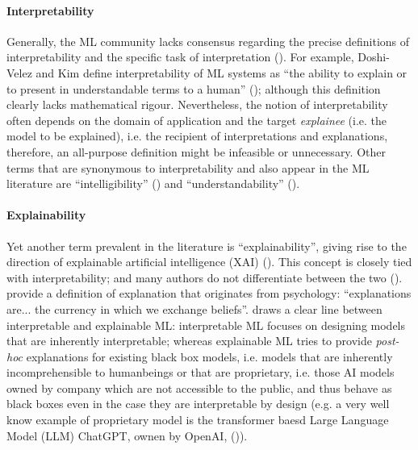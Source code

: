 \documentclass[binding=0.6cm]{sapthesis}
\newcommand{\mycite}[1]{(\cite{#1})}
\begin{document}
\paragraph{Interpretability}
\label{sec:bg.xai.interpretable}
Generally, the ML community lacks consensus regarding the precise definitions of interpretability and the specific task of interpretation \mycite{doshivelez2017-rigorous}. For example, Doshi-Velez and Kim define interpretability of ML systems as “the ability to explain or to present in understandable terms to a human” \mycite{lipton2017-mythos}; although this definition clearly lacks mathematical rigour. Nevertheless, the notion of interpretability often depends on the domain of application and the target \textit{explainee} (i.e. the model to be explained), i.e. the recipient of interpretations and explanations, therefore, an all-purpose definition might be infeasible or unnecessary. Other terms that are synonymous to interpretability and also appear in the ML literature are “intelligibility” \mycite{vilone2021-xai-notions,caruana2015-xai-heatlhcare} and “understandability” \mycite{lipton2017-mythos}. 

\paragraph{Explainability}
\label{sec:bg.xai.explainable}
Yet another term prevalent in the literature is “explainability”, giving rise to the direction of explainable artificial intelligence (XAI) \mycite{turek2021-darpa}. This concept is closely tied with interpretability; and many authors do not differentiate between the two \mycite{carvalho2019-interpr}. \cite{doshivelez2017-rigorous} provide a definition of explanation that originates from psychology: “explanations are... the currency in which we exchange beliefs”. \cite{rudin2019-stop-epxlaining-black-box} draws a clear line between interpretable and explainable ML: interpretable ML focuses on designing models that are inherently interpretable; whereas explainable ML tries to provide \textit{post-hoc} explanations for existing black box models, i.e. models that are inherently incomprehensible to humanbeings or that are proprietary, i.e. those AI models owned by company which are not accessible to the public, and thus behave as black boxes even in the case they are interpretable by design (e.g. a very well know example of proprietary model is the transformer baesd Large Language Model (LLM) ChatGPT, ownen by OpenAI, \mycite{brown2020-gpt3}).
\end{document}
